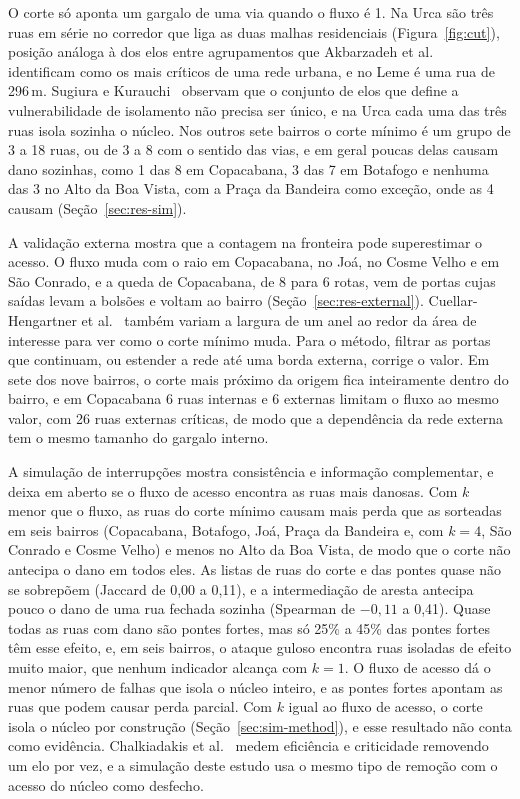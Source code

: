 O corte só aponta um gargalo de uma via quando o fluxo é 1. Na Urca são três
ruas em série no corredor que liga as duas malhas residenciais
(Figura~\ref{fig:cut}), posição análoga à dos elos entre agrupamentos que
Akbarzadeh et al.~\cite{akbarzadeh2019critical} identificam como os mais
críticos de uma rede urbana, e no Leme é uma rua de 296\,m. Sugiura e
Kurauchi~\cite{sugiura2023isolation} observam que o conjunto de elos que define
a vulnerabilidade de isolamento não precisa ser único, e na Urca cada uma das
três ruas isola sozinha o núcleo. Nos outros sete bairros o corte mínimo é um
grupo de 3 a 18 ruas, ou de 3 a 8 com o sentido das vias, e em geral poucas
delas causam dano sozinhas, como 1 das 8 em Copacabana, 3 das 7 em Botafogo e
nenhuma das 3 no Alto da Boa Vista, com a Praça da Bandeira como exceção, onde
as 4 causam (Seção~\ref{sec:res-sim}).

A validação externa mostra que a contagem na fronteira pode superestimar o
acesso. O fluxo muda com o raio em Copacabana, no Joá, no Cosme Velho e em São
Conrado, e a queda de Copacabana, de 8 para 6 rotas, vem de portas cujas
saídas levam a bolsões e voltam ao bairro (Seção~\ref{sec:res-external}).
Cuellar-Hengartner et al.~\cite{cuellar2015checkpoints} também variam a
largura de um anel ao redor da área de interesse para ver como o corte mínimo
muda. Para o método, filtrar as portas que continuam, ou estender a rede até
uma borda externa, corrige o valor. Em sete dos nove bairros, o corte mais
próximo da origem fica inteiramente dentro do bairro, e em Copacabana 6 ruas
internas e 6 externas limitam o fluxo ao mesmo valor, com 26 ruas externas
críticas, de modo que a dependência da rede externa tem o mesmo tamanho do
gargalo interno.

A simulação de interrupções mostra consistência e informação complementar, e
deixa em aberto se o fluxo de acesso encontra as ruas mais danosas. Com $k$
menor que o fluxo, as ruas do corte mínimo causam mais perda que as sorteadas
em seis bairros (Copacabana, Botafogo, Joá, Praça da Bandeira e, com $k=4$, São
Conrado e Cosme Velho) e menos no Alto da Boa Vista, de modo que o corte não
antecipa o dano em todos eles. As listas de ruas do corte e das pontes quase
não se sobrepõem (Jaccard de 0,00 a 0,11), e a intermediação de aresta antecipa
pouco o dano de uma rua fechada sozinha (Spearman de $-0{,}11$ a 0,41). Quase
todas as ruas com dano são pontes fortes, mas só 25\% a 45\% das pontes fortes
têm esse efeito, e, em seis bairros, o ataque guloso encontra ruas isoladas de
efeito muito maior, que nenhum indicador alcança com $k=1$. O fluxo de acesso
dá o menor número de falhas que isola o núcleo inteiro, e as pontes fortes
apontam as ruas que podem causar perda parcial. Com $k$ igual ao fluxo de
acesso, o corte isola o núcleo por construção (Seção~\ref{sec:sim-method}), e
esse resultado não conta como evidência. Chalkiadakis et
al.~\cite{chalkiadakis2022resilience} medem eficiência e criticidade removendo
um elo por vez, e a simulação deste estudo usa o mesmo tipo de remoção com o
acesso do núcleo como desfecho.

